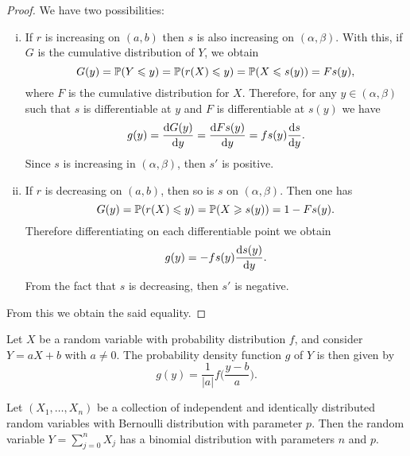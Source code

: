 \begin{proof}
    We have two possibilities:
    \begin{enumerate}[(i)]\setlength\itemsep{0em}
        \item If \(r\) is increasing on \((a, b)\) then \(s\) is also increasing on
              \((\alpha, \beta)\). With this, if \(G\) is the cumulative distribution of
              \(Y\), we obtain
              \[
                  G(y) = \operatorname{\mathbb{P}}(Y \leqslant y)
                  =  \operatorname{\mathbb{P}}(r(X) \leqslant y)
                  = \operatorname{\mathbb{P}}(X \leqslant s(y))
                  = F s(y),
              \]
              where \(F\) is the cumulative distribution for \(X\). Therefore, for any \(y
              \in (\alpha, \beta)\) such that \(s\) is differentiable at \(y\) and \(F\) is
              differentiable at \(s(y)\) we have
              \[
                  g(y) = \frac{\mathrm{d} G(y)}{\mathrm{d} y}
                  = \frac{\mathrm{d} F s(y)}{\mathrm{d} y}
                  = fs(y) \frac{\mathrm{d} s}{\mathrm{d} y}.
              \]
              Since \(s\) is increasing in \((\alpha, \beta)\), then \(s'\) is positive.

        \item If \(r\) is decreasing on \((a, b)\), then so is \(s\) on
              \((\alpha, \beta)\). Then one has
              \[
                  G(y) = \operatorname{\mathbb{P}}(r(X) \leqslant y)
                  = \operatorname{\mathbb{P}}(X \geqslant s(y))
                  = 1 - F s(y).
              \]
              Therefore differentiating on each differentiable point we obtain
              \[
                  g(y) = -f s(y) \frac{\mathrm{d} s(y)}{\mathrm{d} y}.
              \]
              From the fact that \(s\) is decreasing, then \(s'\) is negative.
    \end{enumerate}
    From this we obtain the said equality.
\end{proof}

\begin{corollary}
    \label{cor:linear-fn-of-rand-var}
    Let \(X\) be a random variable with probability distribution \(f\), and consider
    \(Y = a X + b\) with \(a \neq 0\). The probability density function \(g\) of
    \(Y\) is then given by
    \[
        g(y) = \frac{1}{|a|} f\Big(\frac{y - b}{a}\Big).
    \]
\end{corollary}

\begin{proposition}
    \label{prop:sum-bernoulli-rv-is-binomial}
    Let \((X_1, \dots, X_n)\) be a collection of independent and identically
    distributed random variables with Bernoulli distribution with parameter
    \(p\). Then the random variable \(Y = \sum_{j=0}^n X_j\) has a binomial
    distribution with parameters \(n\) and \(p\).
\end{proposition}

